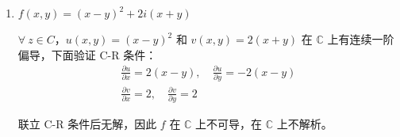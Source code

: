 \documentclass[UTF8]{report}
\def\C{\mathbb{C}}
\theoremstyle{MyLineTheoremStyle} %
\theoremstyle{MyBlockTheoremStyle} %
\theoremstyle{MySubsubsectionStyle} %
\begin{document}
\begin{enumerate}
\item $f(x,y) = (x-y)^2 + 2i(x+y)$

$\forall\  z \in C$，$u(x,y) = (x-y)^2$ 和 $v(x,y) = 2(x+y)$ 在 $\C$ 上有连续一阶偏导，下面验证 C-R 条件：
\begin{gather}
\frac{\partial u }{\partial x } = 2(x-y), \quad \frac{\partial u }{\partial y } = -2(x-y) \\ 
\frac{\partial v }{\partial x } = 2, \quad \frac{\partial v }{\partial y } = 2
\end{gather}

联立 C-R 条件后无解，因此 $f$ 在 $\C$ 上不可导，在 $\C$ 上不解析。



\end{enumerate}
\end{document}
